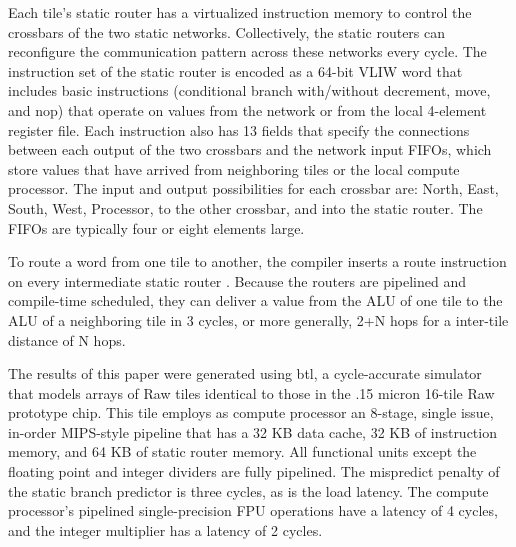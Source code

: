 Each tile's static router has a virtualized instruction memory to
control the crossbars of the two static networks. Collectively, the
static routers can reconfigure the communication pattern across these
networks every cycle.  The instruction set of the static router is
encoded as a 64-bit VLIW word that includes basic instructions
(conditional branch with/without decrement, move, and nop) that
operate on values from the network or from the local 4-element
register file. Each instruction also has 13 fields that specify the
connections between each output of the two crossbars and the network
input FIFOs, which store values that have arrived from neighboring
tiles or the local compute processor.  The input and output
possibilities for each crossbar are: North, East, South, West,
Processor, to the other crossbar, and into the static router. The
FIFOs are typically four or eight elements large.

To route a word from one tile to another, the compiler inserts a route
instruction on every intermediate static router \cite{lee98spacetime}.
Because the routers are pipelined and compile-time scheduled, they can
deliver a value from the ALU of one tile to the ALU of a neighboring
tile in 3 cycles, or more generally, 2+N hops for a inter-tile
distance of N hops.

The results of this paper were generated using btl, a cycle-accurate
simulator that models arrays of Raw tiles identical to those in the
.15 micron 16-tile Raw prototype chip.  This tile employs as compute
processor an 8-stage, single issue, in-order MIPS-style pipeline that
has a 32 KB data cache, 32 KB of instruction memory, and 64 KB of
static router memory. All functional units except the floating point
and integer dividers are fully pipelined. The mispredict penalty of
the static branch predictor is three cycles, as is the load
latency. The compute processor's pipelined single-precision FPU
operations have a latency of 4 cycles, and the integer multiplier has
a latency of 2 cycles.



